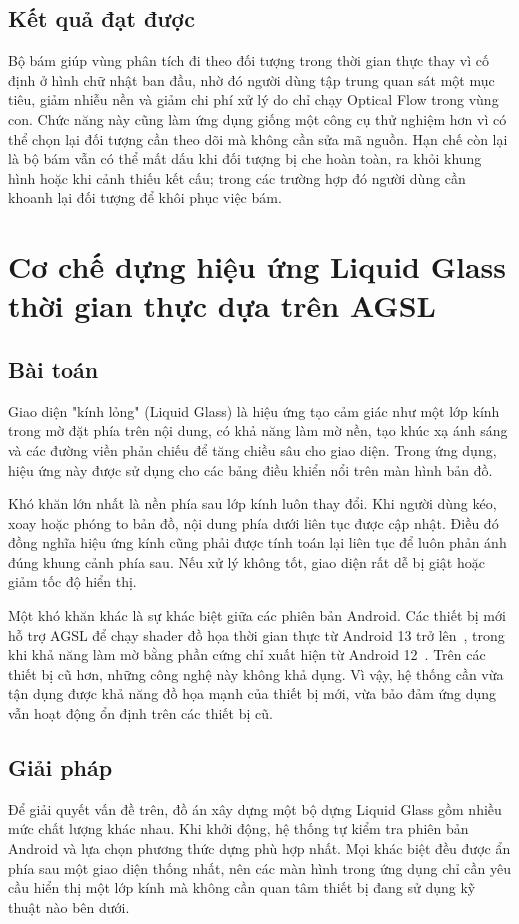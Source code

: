 \documentclass[../DoAn.tex]{subfiles}
\begin{document}
\subsection{Kết quả đạt được}
Bộ bám giúp vùng phân tích đi theo đối tượng trong thời gian thực thay vì cố định ở hình chữ nhật ban đầu, nhờ đó người dùng tập trung quan sát một mục tiêu, giảm nhiễu nền và giảm chi phí xử lý do chỉ chạy Optical Flow trong vùng con. Chức năng này cũng làm ứng dụng giống một công cụ thử nghiệm hơn vì có thể chọn lại đối tượng cần theo dõi mà không cần sửa mã nguồn. Hạn chế còn lại là bộ bám vẫn có thể mất dấu khi đối tượng bị che hoàn toàn, ra khỏi khung hình hoặc khi cảnh thiếu kết cấu; trong các trường hợp đó người dùng cần khoanh lại đối tượng để khôi phục việc bám.

\section{Cơ chế dựng hiệu ứng Liquid Glass thời gian thực dựa trên AGSL}
\label{section:5.liquidglass}
\subsection{Bài toán}
Giao diện "kính lỏng" (Liquid Glass) là hiệu ứng tạo cảm giác như một lớp kính trong mờ đặt phía trên nội dung, có khả năng làm mờ nền, tạo khúc xạ ánh sáng và các đường viền phản chiếu để tăng chiều sâu cho giao diện. Trong ứng dụng, hiệu ứng này được sử dụng cho các bảng điều khiển nổi trên màn hình bản đồ.

Khó khăn lớn nhất là nền phía sau lớp kính luôn thay đổi. Khi người dùng kéo, xoay hoặc phóng to bản đồ, nội dung phía dưới liên tục được cập nhật. Điều đó đồng nghĩa hiệu ứng kính cũng phải được tính toán lại liên tục để luôn phản ánh đúng khung cảnh phía sau. Nếu xử lý không tốt, giao diện rất dễ bị giật hoặc giảm tốc độ hiển thị.

Một khó khăn khác là sự khác biệt giữa các phiên bản Android. Các thiết bị mới hỗ trợ AGSL để chạy shader đồ họa thời gian thực từ Android 13 trở lên~\cite{android-agsl}, trong khi khả năng làm mờ bằng phần cứng chỉ xuất hiện từ Android 12~\cite{android-rendereffect}. Trên các thiết bị cũ hơn, những công nghệ này không khả dụng. Vì vậy, hệ thống cần vừa tận dụng được khả năng đồ họa mạnh của thiết bị mới, vừa bảo đảm ứng dụng vẫn hoạt động ổn định trên các thiết bị cũ.

\subsection{Giải pháp}
Để giải quyết vấn đề trên, đồ án xây dựng một bộ dựng Liquid Glass gồm nhiều mức chất lượng khác nhau. Khi khởi động, hệ thống tự kiểm tra phiên bản Android và lựa chọn phương thức dựng phù hợp nhất. Mọi khác biệt đều được ẩn phía sau một giao diện thống nhất, nên các màn hình trong ứng dụng chỉ cần yêu cầu hiển thị một lớp kính mà không cần quan tâm thiết bị đang sử dụng kỹ thuật nào bên dưới.
\end{document}
